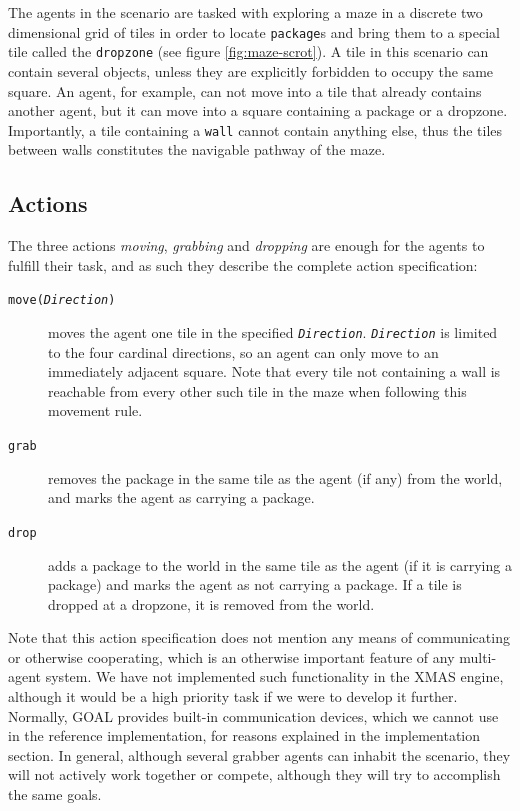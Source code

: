 The agents in the scenario are tasked with exploring a maze in a discrete
two dimensional grid of tiles in order to locate \texttt{package}s
and bring them to a special tile called the \texttt{dropzone} (see
figure \ref{fig:maze-scrot}). A tile in this scenario can contain
several objects, unless they are explicitly forbidden to occupy the
same square. An agent, for example, can not move into a tile that
already contains another agent, but it can move into a square containing
a package or a dropzone. Importantly, a tile containing a \texttt{wall}
cannot contain anything else, thus the tiles between walls constitutes
the navigable pathway of the maze. 


\subsection*{Actions}

The three actions \emph{moving}, \emph{grabbing} and \emph{dropping}
are enough for the agents to fulfill their task, and as such they
describe the complete action specification:
\begin{description}
\item [{\texttt{move(}\texttt{\emph{Direction}}\texttt{)}}] moves the agent
one tile in the specified \texttt{\emph{Direction}}. \texttt{\emph{Direction}}\emph{
}is limited to the four cardinal directions, so an agent can only
move to an immediately adjacent square. Note that every tile not containing
a wall is reachable from every other such tile in the maze when following
this movement rule.
\item [{\texttt{grab}}] removes the package in the same tile as the agent
(if any) from the world, and marks the agent as carrying a package.
\item [{\texttt{drop}}] adds a package to the world in the same tile as
the agent (if it is carrying a package) and marks the agent as not
carrying a package. If a tile is dropped at a dropzone, it is removed
from the world.
\end{description}
Note that this action specification does not mention any means of
communicating or otherwise cooperating, which is an otherwise important
feature of any multi-agent system. We have not implemented such functionality
in the XMAS engine, although it would be a high priority task if we
were to develop it further. Normally, GOAL provides built-in communication
devices, which we cannot use in the reference implementation, for
reasons explained in the implementation section. In general, although
several grabber agents can inhabit the scenario, they will not actively
work together or compete, although they will try to accomplish the
same goals.



